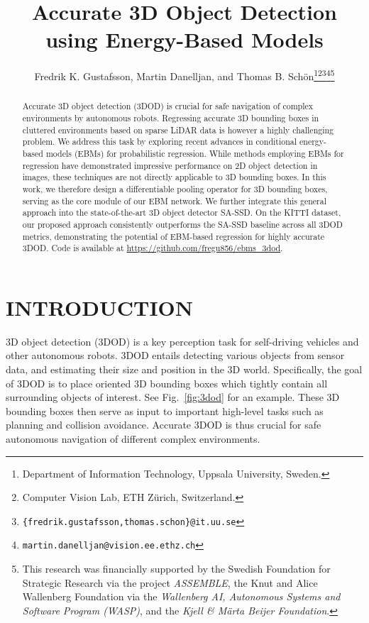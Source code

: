 \documentclass[letterpaper, 10 pt, conference]{ieeeconf}
\title{\LARGE \bf
Accurate 3D Object Detection using Energy-Based Models
}
\author{Fredrik K. Gustafsson, Martin Danelljan, and Thomas B. Sch\"on\thanks{Department of Information Technology, Uppsala University, Sweden.}\thanks{Computer Vision Lab, ETH Z\"urich, Switzerland.}\thanks{{\tt\small \{fredrik.gustafsson,thomas.schon\}@it.uu.se}}\thanks{{\tt\small martin.danelljan@vision.ee.ethz.ch}}\thanks{This research was financially supported by the Swedish Foundation for Strategic Research via the project \emph{ASSEMBLE}, the Knut and Alice Wallenberg Foundation via the \emph{Wallenberg AI, Autonomous Systems and Software Program (WASP)}, and the \emph{Kjell \& M\"arta Beijer Foundation}.}}
\begin{document}
\maketitle
\thispagestyle{empty}
\pagestyle{empty}


\begin{abstract}
Accurate 3D object detection (3DOD) is crucial for safe navigation of complex environments by autonomous robots. Regressing accurate 3D bounding boxes in cluttered environments based on sparse LiDAR data is however a highly challenging problem. We address this task by exploring recent advances in conditional energy-based models (EBMs) for probabilistic regression. While methods employing EBMs for regression have demonstrated impressive performance on 2D object detection in images, these techniques are not directly applicable to 3D bounding boxes. In this work, we therefore design a differentiable pooling operator for 3D bounding boxes, serving as the core module of our EBM network. We further integrate this general approach into the state-of-the-art 3D object detector SA-SSD. On the KITTI dataset, our proposed approach consistently outperforms the SA-SSD baseline across all 3DOD metrics, demonstrating the potential of EBM-based regression for highly accurate 3DOD. Code is available at \url{https://github.com/fregu856/ebms_3dod}. 



\end{abstract}





\section{INTRODUCTION}
\label{section:introduction}

3D object detection (3DOD) is a key perception task for self-driving vehicles and other autonomous robots. 3DOD entails detecting various objects from sensor data, and estimating their size and position in the 3D world. Specifically, the goal of 3DOD is to place oriented 3D bounding boxes which tightly contain all surrounding objects of interest. See Fig.~\ref{fig:3dod} for an example. These 3D bounding boxes then serve as input to important high-level tasks such as planning and collision avoidance. Accurate 3DOD is thus crucial for safe autonomous navigation of different complex environments.
\end{document}
